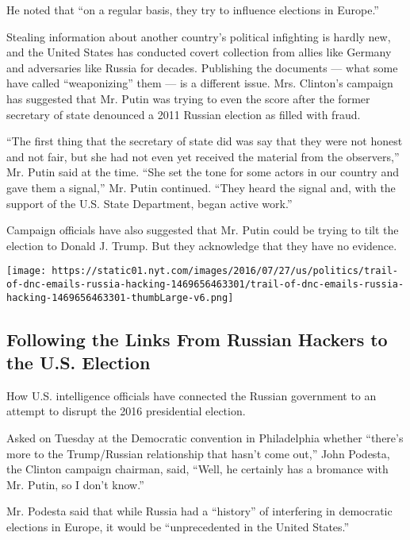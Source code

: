 He noted that ``on a regular basis, they try to influence elections in
Europe.''

Stealing information about another country's political infighting is
hardly new, and the United States has conducted covert collection from
allies like Germany and adversaries like Russia for decades. Publishing
the documents --- what some have called ``weaponizing'' them --- is a
different issue. Mrs. Clinton's campaign has suggested that Mr. Putin
was trying to even the score after the former secretary of state
denounced a 2011 Russian election as filled with fraud.

``The first thing that the secretary of state did was say that they were
not honest and not fair, but she had not even yet received the material
from the observers,'' Mr. Putin said at the time. ``She set the tone for
some actors in our country and gave them a signal,'' Mr. Putin
continued. ``They heard the signal and, with the support of the U.S.
State Department, began active work.''

Campaign officials have also suggested that Mr. Putin could be trying to
tilt the election to Donald J. Trump. But they acknowledge that they
have no evidence.

\href{https://www.nytimes.com/interactive/2016/07/27/us/politics/trail-of-dnc-emails-russia-hacking.html}{}

\texttt{[image: https://static01.nyt.com/images/2016/07/27/us/politics/trail-of-dnc-emails-russia-hacking-1469656463301/trail-of-dnc-emails-russia-hacking-1469656463301-thumbLarge-v6.png]}

\hypertarget{following-the-links-from-russian-hackers-to-the-us-election}{%
\subsection{Following the Links From Russian Hackers to the U.S.
Election}\label{following-the-links-from-russian-hackers-to-the-us-election}}

How U.S. intelligence officials have connected the Russian government to
an attempt to disrupt the 2016 presidential election.

Asked on Tuesday at the Democratic convention in Philadelphia whether
``there's more to the Trump/Russian relationship that hasn't come out,''
John Podesta, the Clinton campaign chairman, said, ``Well, he certainly
has a bromance with Mr. Putin, so I don't know.''

Mr. Podesta said that while Russia had a ``history'' of interfering in
democratic elections in Europe, it would be ``unprecedented in the
United States.''

